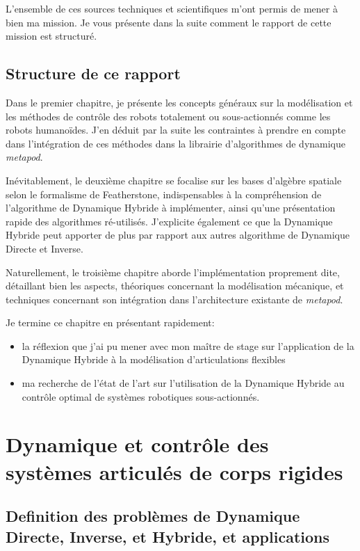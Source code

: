 \documentclass{report}
\begin{document}
L'ensemble de ces sources techniques et scientifiques m'ont permis de mener à bien ma mission. Je vous présente dans la suite comment le rapport de cette mission est structuré.

\section*{Structure de ce rapport}
Dans le premier chapitre, je présente les concepts généraux sur la modélisation et les méthodes de contrôle des robots totalement ou sous-actionnés comme les robots humanoïdes. J'en déduit par la suite les contraintes à prendre en compte dans l'intégration de ces méthodes dans la librairie d'algorithmes de dynamique \emph{metapod}.

Inévitablement, le deuxième chapitre se focalise sur les bases d'algèbre spatiale selon le formalisme de Featherstone, indispensables à la compréhension de l'algorithme de Dynamique Hybride à implémenter, ainsi qu'une présentation rapide des algorithmes ré-utilisés. J'explicite également ce que la Dynamique Hybride peut apporter de plus par rapport aux autres algorithme de Dynamique Directe et Inverse.

Naturellement, le troisième chapitre aborde l'implémentation proprement dite, détaillant bien les aspects, théoriques concernant la modélisation mécanique, et techniques concernant son intégration dans l'architecture existante de \emph{metapod}.

Je termine ce chapitre en présentant rapidement:
\begin{itemize}
\item la réflexion que j'ai pu mener avec mon maître de stage sur l'application de la Dynamique Hybride à la modélisation d'articulations flexibles
\item ma recherche de l'état de l'art sur l'utilisation de la Dynamique Hybride au contrôle optimal de systèmes robotiques sous-actionnés.
\end{itemize}




\chapter{Dynamique et contrôle des systèmes articulés de corps rigides}

\section{Definition des problèmes de Dynamique Directe, Inverse, et Hybride, et applications} \label{ch_concepts_definitions}
\end{document}
